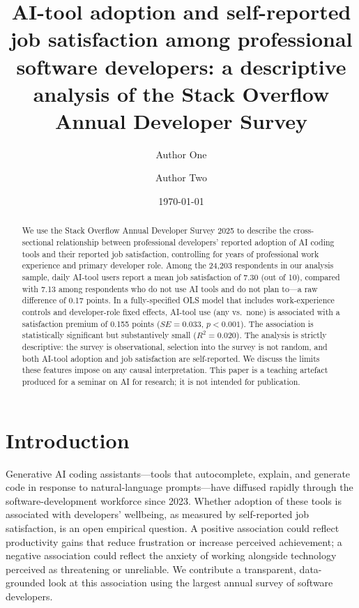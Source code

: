 \documentclass[11pt]{article}
\title{AI-tool adoption and self-reported job satisfaction among professional
software developers: a descriptive analysis of the Stack Overflow Annual
Developer Survey}
\author[1]{Author One}
\author[1]{Author Two}
\affil[1]{Universidade Cat\'olica Portuguesa}
\date{\today}
\begin{document}
\maketitle

\begin{abstract}
We use the Stack Overflow Annual Developer Survey 2025 to describe the
cross-sectional relationship between professional developers' reported
adoption of AI coding tools and their reported job satisfaction, controlling
for years of professional work experience and primary developer role.
Among the 24,203 respondents in our analysis sample, daily AI-tool users
report a mean job satisfaction of 7.30 (out of 10), compared with 7.13 among
respondents who do not use AI tools and do not plan to---a raw difference of
0.17 points. In a fully-specified OLS model that includes work-experience
controls and developer-role fixed effects, AI-tool use (any vs.\ none) is
associated with a satisfaction premium of 0.155 points
($SE = 0.033$, $p < 0.001$). The association is statistically significant but
substantively small ($R^{2} = 0.020$). The analysis is strictly descriptive:
the survey is observational, selection into the survey is not random, and
both AI-tool adoption and job satisfaction are self-reported. We discuss the
limits these features impose on any causal interpretation. This paper is a
teaching artefact produced for a seminar on AI for research; it is not
intended for publication.
\end{abstract}

\section{Introduction}

Generative AI coding assistants---tools that autocomplete, explain, and
generate code in response to natural-language prompts---have diffused rapidly
through the software-development workforce since 2023. Whether adoption of
these tools is associated with developers' wellbeing, as measured by
self-reported job satisfaction, is an open empirical question. A positive
association could reflect productivity gains that reduce frustration or
increase perceived achievement; a negative association could reflect the
anxiety of working alongside technology perceived as threatening or
unreliable. We contribute a transparent, data-grounded look at this
association using the largest annual survey of software developers.
\end{document}
